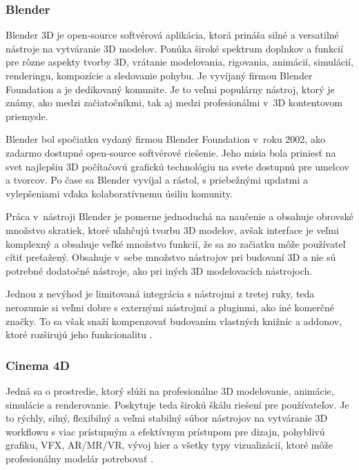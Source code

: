\FloatBarrier 

\subsubsection{Blender}

Blender 3D je open-source softvérová aplikácia, ktorá prináša silné a versatilné nástroje na vytváranie 3D modelov. Ponúka široké spektrum doplnkov a funkcií pre rôzne aspekty tvorby 3D, vrátanie modelovania, rigovania, animácií, simulácií, renderingu, kompozície a sledovanie pohybu. Je vyvíjaný firmou Blender Foundation a je dedikovaný komunite. Je to veľmi populárny nástroj, ktorý je známy, ako medzi začiatočníkmi, tak aj medzi profesionálmi v~3D kontentovom priemysle. 

Blender bol spočiatku vydaný firmou Blender Foundation v~roku 2002, ako zadarmo dostupné open-source softvérové riešenie. Jeho misia bola priniesť na svet najlepšiu 3D počítačovú grafickú technológiu na svete dostupnú pre umelcov a tvorcov. Po čase sa Blender vyvíjal a rástol, s priebežnými updatmi a vylepšeniami vďaka kolaboratívnemu úsiliu komunity. 

Práca v~nástroji Blender je pomerne jednoduchá na naučenie a obsahuje obrovské množstvo skratiek, ktoré uľahčujú tvorbu 3D modelov, avšak interface je veľmi komplexný a obsahuje veľké množstvo funkcií, že sa zo začiatku môže používateľ cítiť preťažený. Obsahuje v~sebe množstvo nástrojov pri budovaní 3D a nie sú potrebné dodatočné nástroje, ako pri iných 3D modelovacích nástrojoch. 

Jednou z nevýhod je limitovaná integrácia s nástrojmi z tretej ruky, teda nerozumie si veľmi dobre s externými nástrojmi a pluginmi, ako iné komerčné značky. To sa však snaží kompenzovať budovaním vlastných knižníc a addonov, ktoré rozširujú jeho funkcionalitu \cite{hill2023blender}. 

\subsubsection{Cinema 4D}

Jedná sa o prostredie, ktorý slúži na profesionálne 3D modelovanie, animácie, simulácie a renderovanie. Poskytuje teda širokú škálu riešení pre používateľov. Je to rýchly, silný, flexibilný a veľmi stabilný súbor nástrojov na vytváranie 3D workflowu s viac prístupným a efektívnym prístupom pre dizajn, pohyblivú grafiku, VFX, AR/MR/VR, vývoj hier a všetky typy vizualizácií, ktoré môže profesionálny modelár potrebovať \cite{maxon2024cinema4d}. 

